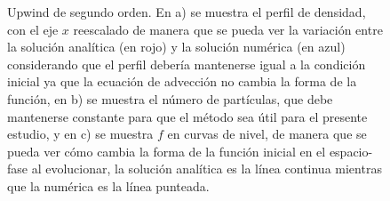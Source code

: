 \documentclass[11pt,twoside,openright,spanish]{report}
\numberwithin{equation}{chapter}
\numberwithin{figure}{chapter}
\numberwithin{table}{chapter}
\begin{document}
\begin{figure}[p]
	\caption{Upwind de segundo orden. En a) se muestra el perfil de densidad, con el eje $x$ reescalado de manera que se pueda ver la variación entre la solución analítica (en rojo) y la solución numérica (en azul) considerando que el perfil debería mantenerse igual a la condición inicial ya que la ecuación de advección no cambia la forma de la función, en b) se muestra el número de partículas, que debe mantenerse constante para que el método sea útil para el presente estudio, y en c) se muestra $f$ en curvas de nivel, de manera que se pueda ver cómo cambia la forma de la función inicial en el espacio-fase al evolucionar, la solución analítica es la línea continua mientras que la numérica es la línea punteada.}
	\label{upwind2}
\end{figure}
\end{document}
